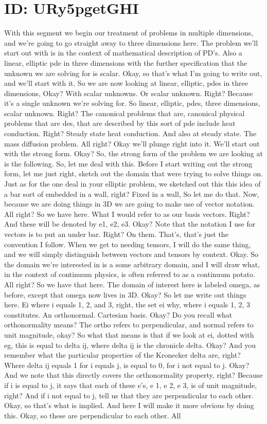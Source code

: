 \documentclass[10pt]{article}
\begin{document}
\section*{ID: URy5pgetGHI}
With this segment we begin our treatment of problems in multiple dimensions, and we're going to go straight away to three dimensions here. The problem we'll start out with is in the context of mathematical description of PD's. Also a linear, elliptic pde in three dimensions with the further specification that the unknown we are solving for is scalar. Okay, so that's what I'm going to write out, and we'll start with it. So we are now looking at linear, elliptic, pdes in three dimensions, Okay? With scalar unknowns. Or scalar unknown. Right? Because it's a single unknown we're solving for. So linear, elliptic, pdes, three dimensions, scalar unknown. Right? The canonical problems that are, canonical physical problems that are des, that are described by this sort of pde include heat conduction. Right? Steady state heat conduction. And also at steady state. The mass diffusion problem. All right? Okay we'll plunge right into it. We'll start out with the strong form. Okay? So, the strong form of the problem we are looking at is the following. So, let me deal with this. Before I start writing out the strong form, let me just right, sketch out the domain that were trying to solve things on. Just as for the one deal in your elliptic problem, we sketched out this this idea of a bar sort of embedded in a wall, right? Fixed in a wall, So let me do that. Now, because we are doing things in 3D we are going to make use of vector notation. All right? So we have here. What I would refer to as our basis vectors. Right? And these will be denoted by e1, e2, e3. Okay? Note that the notation I use for vectors is to put an under bar. Right? On them. That's, that's just the convention I follow. When we get to needing tensors, I will do the same thing, and we will simply distinguish between vectors and tensors by context. Okay. So the domain we're interested in is a some arbitrary domain, and I will draw what, in the context of continuum physics, is often referred to as a continuum potato. All right? So we have that here. The domain of interest here is labeled omega, as before, except that omega now lives in 3D. Okay? So let me write out things here. Ei where i equals 1, 2, and 3, right, the set ei why, where i equals 1, 2, 3 constitutes. An orthonormal. Cartesian basis. Okay? Do you recall what orthonormality means? The ortho refers to perpendicular, and normal refers to unit magnitude, okay? So what that means is that if we look at ei, dotted with eg, this is equal to delta ij, where delta ij is the chronicle delta. Okay? And you remember what the particular properties of the Kronecker delta are, right? Where delta ij equals 1 for i equals j, is equal to 0, for i not equal to j. Okay? And we note that this directly covers the orthonormality property, right? Because if i is equal to j, it says that each of these e's, e 1, e 2, e 3, is of unit magnitude, right? And if i not equal to j, tell us that they are perpendicular to each other. Okay, so that's what is implied. And here I will make it more obvious by doing this. Okay, so these are perpendicular to each other. All 
\end{document}
